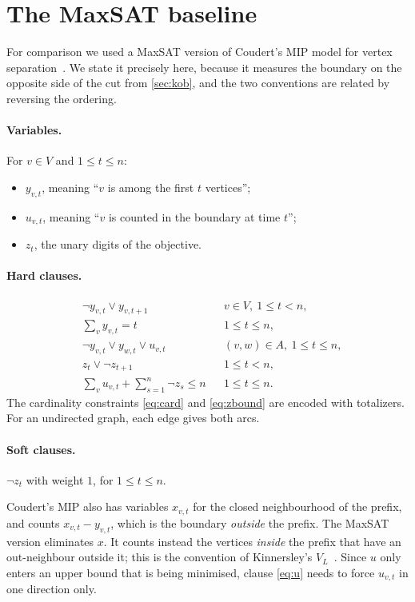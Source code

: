 \documentclass[11pt]{article}
\theoremstyle{definition}
\begin{document}
\section{The MaxSAT baseline}\label{sec:maxsat}

For comparison we used a MaxSAT version of Coudert's MIP model for vertex
separation~\cite{Cou16,CouCode}. We state it precisely here, because it
measures the boundary on the opposite side of the cut from \cref{sec:kob},
and the two conventions are related by reversing the ordering.

\paragraph{Variables.} For $v\in V$ and $1\le t\le n$:
\begin{itemize}
\item $y_{v,t}$, meaning ``$v$ is among the first $t$ vertices'';
\item $u_{v,t}$, meaning ``$v$ is counted in the boundary at time $t$'';
\item $z_t$, the unary digits of the objective.
\end{itemize}

\paragraph{Hard clauses.}
\begin{align}
&\lnot y_{v,t}\lor y_{v,t+1} && v\in V,\ 1\le t<n, \label{eq:mono}\\
&\textstyle\sum_{v} y_{v,t}=t && 1\le t\le n, \label{eq:card}\\
&\lnot y_{v,t}\lor y_{w,t}\lor u_{v,t} && (v,w)\in A,\ 1\le t\le n, \label{eq:u}\\
&z_t\lor\lnot z_{t+1} && 1\le t<n, \label{eq:zmono}\\
&\textstyle\sum_{v} u_{v,t}+\sum_{s=1}^{n}\lnot z_s\le n && 1\le t\le n. \label{eq:zbound}
\end{align}
The cardinality constraints \eqref{eq:card} and \eqref{eq:zbound} are
encoded with totalizers. For an undirected graph, each edge gives both arcs.

\paragraph{Soft clauses.} $\lnot z_t$ with weight $1$, for $1\le t\le n$.

Coudert's MIP also has variables $x_{v,t}$ for the closed neighbourhood of
the prefix, and counts $x_{v,t}-y_{v,t}$, which is the boundary
\emph{outside} the prefix. The MaxSAT version eliminates $x$. It counts
instead the vertices \emph{inside} the prefix that have an out-neighbour
outside it; this is the convention of Kinnersley's $V_L$~\cite{Kin92}.
Since $u$ only enters an upper bound that is being minimised, clause
\eqref{eq:u} needs to force $u_{v,t}$ in one direction only.
\end{document}
